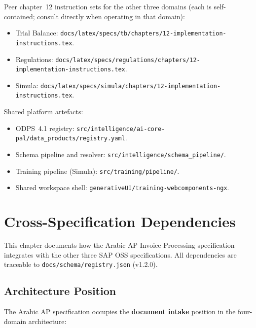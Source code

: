 \documentclass[11pt,a4paper,twoside]{report}
\begin{document}
Peer chapter~12 instruction sets for the other three domains (each
is self-contained; consult directly when operating in that domain):
\begin{itemize}
  \item Trial Balance:
    \texttt{docs/latex/specs/tb/chapters/12-implementation-instructions.tex}.
  \item Regulations:
    \texttt{docs/latex/specs/regulations/chapters/12-implementation-instructions.tex}.
  \item Simula:
    \texttt{docs/latex/specs/simula/chapters/12-implementation-instructions.tex}.
\end{itemize}

Shared platform artefacts:
\begin{itemize}
  \item ODPS~4.1 registry:
    \texttt{src/intelligence/ai-core-pal/data\_products/registry.yaml}.
  \item Schema pipeline and resolver:
    \texttt{src/intelligence/schema\_pipeline/}.
  \item Training pipeline (Simula):
    \texttt{src/training/pipeline/}.
  \item Shared workspace shell:
    \texttt{generativeUI/training-webcomponents-ngx}.
\end{itemize}

\chapter{Cross-Specification Dependencies}
\label{ch:cross-spec}

This chapter documents how the Arabic AP Invoice Processing specification
integrates with the other three SAP OSS specifications. All dependencies
are traceable to \texttt{docs/schema/registry.json} (v1.2.0).

\section{Architecture Position}
\label{sec:arch-position}

The Arabic AP specification occupies the \textbf{document intake} position in
the four-domain architecture:
\end{document}
